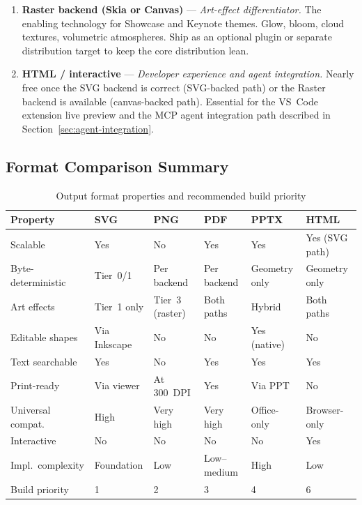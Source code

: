 \begin{enumerate}
  \item \textbf{Raster backend (Skia or Canvas)} --- \emph{Art-effect differentiator.}
        The enabling technology for Showcase and Keynote themes. Glow, bloom, cloud
        textures, volumetric atmospheres. Ship as an optional plugin or separate
        distribution target to keep the core distribution lean.

  \item \textbf{HTML / interactive} --- \emph{Developer experience and agent integration.}
        Nearly free once the SVG backend is correct (SVG-backed path) or the Raster
        backend is available (canvas-backed path). Essential for the VS~Code extension
        live preview and the MCP agent integration path described in
        Section~\ref{sec:agent-integration}.
\end{enumerate}

\subsection{Format Comparison Summary}
\label{sec:format-comparison}

\begin{table}[h]
\centering
\small
\begin{tabularx}{\textwidth}{lXXXXX}
\toprule
\textbf{Property} & \textbf{SVG} & \textbf{PNG} & \textbf{PDF} & \textbf{PPTX} & \textbf{HTML} \\
\midrule
Scalable               & Yes          & No           & Yes          & Yes           & Yes (SVG path) \\
Byte-deterministic     & Tier~0/1     & Per backend  & Per backend  & Geometry only & Geometry only \\
Art effects            & Tier~1 only  & Tier~3 (raster) & Both paths & Hybrid       & Both paths \\
Editable shapes        & Via Inkscape & No           & No           & Yes (native)  & No \\
Text searchable        & Yes          & No           & Yes          & Yes           & Yes \\
Print-ready            & Via viewer   & At 300~DPI   & Yes          & Via PPT       & No \\
Universal compat.      & High         & Very high    & Very high    & Office-only   & Browser-only \\
Interactive            & No           & No           & No           & No            & Yes \\
Impl.\ complexity      & Foundation   & Low          & Low--medium  & High          & Low \\
Build priority         & 1            & 2            & 3            & 4             & 6 \\
\bottomrule
\end{tabularx}
\caption{Output format properties and recommended build priority}
\label{tab:format-comparison}
\end{table}

